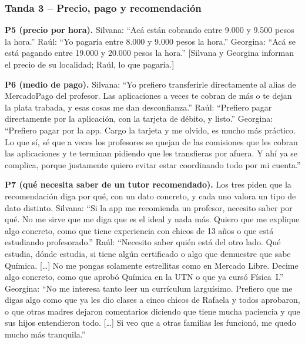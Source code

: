 \subsubsection*{Tanda 3 -- Precio, pago y recomendación}

\textbf{P5 (precio por hora).} Silvana: ``Acá están cobrando entre 9.000
y 9.500 pesos la hora.'' Raúl: ``Yo pagaría entre 8.000 y 9.000 pesos la
hora.'' Georgina: ``Acá se está pagando entre 19.000 y 20.000 pesos la
hora.'' [Silvana y Georgina informan el precio de su localidad; Raúl, lo
que pagaría.]

\textbf{P6 (medio de pago).} Silvana: ``Yo prefiero transferirle
directamente al alias de MercadoPago del profesor. Las aplicaciones a
veces te cobran de más o te dejan la plata trabada, y esas cosas me dan
desconfianza.'' Raúl: ``Prefiero pagar directamente por la aplicación,
con la tarjeta de débito, y listo.'' Georgina: ``Prefiero pagar por la
app. Cargo la tarjeta y me olvido, es mucho más práctico. Lo que sí, sé
que a veces los profesores se quejan de las comisiones que les cobran las
aplicaciones y te terminan pidiendo que les transfieras por afuera. Y ahí
ya se complica, porque justamente quiero evitar estar coordinando todo
por mi cuenta.''

\textbf{P7 (qué necesita saber de un tutor recomendado).} Los tres piden
que la recomendación diga por qué, con un dato concreto, y cada uno
valora un tipo de dato distinto. Silvana: ``Si la app me recomienda un
profesor, necesito saber por qué. No me sirve que me diga que es el ideal
y nada más. Quiero que me explique algo concreto, como que tiene
experiencia con chicos de 13 años o que está estudiando profesorado.''
Raúl: ``Necesito saber quién está del otro lado. Qué estudia, dónde
estudia, si tiene algún certificado o algo que demuestre que sabe
Química. [\ldots] No me pongas solamente estrellitas como en Mercado
Libre. Decime algo concreto, como que aprobó Química en la UTN o que ya
cursó Física~I.'' Georgina: ``No me interesa tanto leer un currículum
larguísimo. Prefiero que me digas algo como que ya les dio clases a cinco
chicos de Rafaela y todos aprobaron, o que otras madres dejaron
comentarios diciendo que tiene mucha paciencia y que sus hijos
entendieron todo. [\ldots] Si veo que a otras familias les funcionó, me
quedo mucho más tranquila.''
